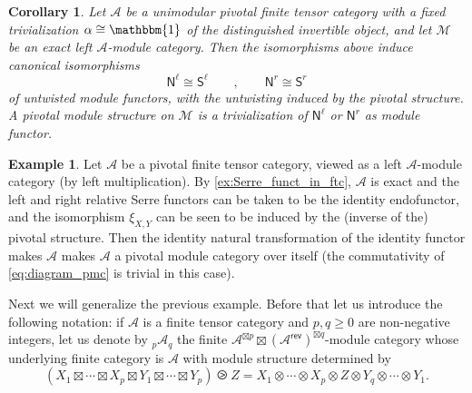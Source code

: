 \documentclass[11pt]{article}
\newtheorem{corollary}[theorem]{Corollary}
\theoremstyle{definition}
\newtheorem{example}[theorem]{Example}
\begin{document}
\begin{corollary}\label{corfss}
	Let $\mathcal{A}$ be  a unimodular pivotal finite tensor category with a fixed trivialization
	$\alpha \cong \mathbbm{1}$ of the distinguished invertible object, and let $\mathcal{M}$ be an exact left $\mathcal{A}$-module category. Then the isomorphisms above induce canonical isomorphisms
	$$ \mathsf{N}^\ell \cong  \mathsf{S}^\ell \qquad , \qquad  \mathsf{N}^r \cong  \mathsf{S}^r $$
	of untwisted module functors, with the untwisting induced by the pivotal structure.
	A pivotal module structure on $\mathcal{M}$ is a trivialization of $\mathsf{N}^\ell$ or $\mathsf{N}^r$ as module functor.
\end{corollary}



\begin{example}
Let $\mathcal{A}$ be a pivotal finite tensor category, viewed as a left $\mathcal{A}$-module category (by left multiplication). By \cref{ex:Serre_funct_in_ftc}, $\mathcal{A}$ is exact and the left and right relative Serre functors can be taken to be the identity endofunctor, and the isomorphism $\xi_{X,Y}$ can be seen to be induced by the (inverse of the) pivotal structure. Then the identity natural transformation of the identity functor makes $\mathcal{A}$ makes $\mathcal{A}$ a pivotal module category over itself (the commutativity of \eqref{eq:diagram_pmc} is trivial in this case).
\end{example}



Next we will generalize the previous example. Before that let us introduce the following notation: if $\mathcal{A}$ is a finite tensor category and $p,q \geq 0$ are non-negative integers, let us denote by  ${}_p \mathcal{A}_q$ the finite $\mathcal{A}^{\boxtimes p}\boxtimes \left( \mathcal{A}^{\mathsf{rev}} \right)^{\boxtimes q}$-module category whose underlying finite category is $\mathcal{A}$ with module structure determined by $$(X_1 \boxtimes \cdots \boxtimes X_p \boxtimes Y_1 \boxtimes \cdots \boxtimes Y_p) \ogreaterthan Z=  X_1 \otimes \cdots \otimes  X_p \otimes Z \otimes Y_q \otimes \cdots \otimes Y_1.  $$
\end{document}
